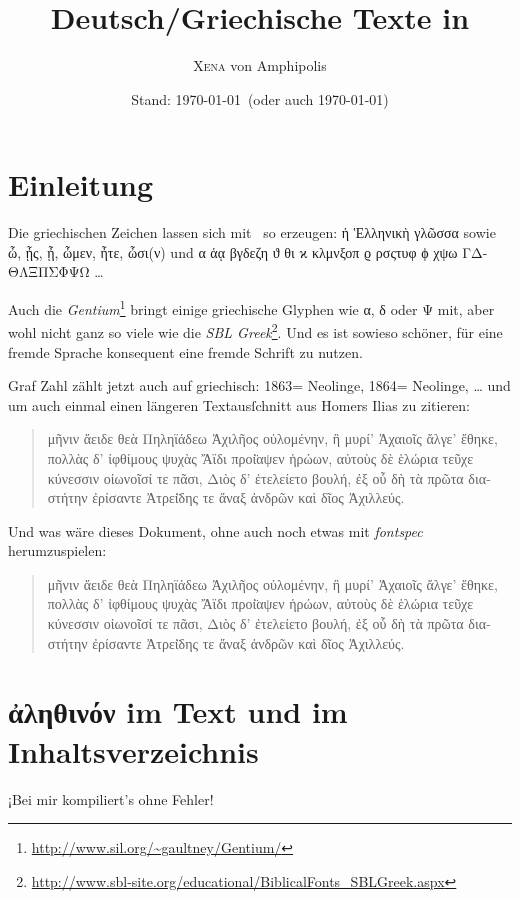 \documentclass[fontsize=10pt]{scrartcl} %
\begin{document}
\title{Deutsch/Griechische Texte in \XeTeX}
\author{\textsc{Xena} von Amphipolis}
\date{Stand: \today\ (oder auch \textgreek{\today})}
\maketitle

\tableofcontents

\section{Einleitung}
Die griechischen Zeichen lassen sich mit \XeTeX\ so erzeugen: \textgreek{ἡ Ἑλληνικὴ γλῶσσα} sowie \textgreek{ὦ, ᾖς, ᾖ, ὦμεν, ἦτε, ὦσι(ν)} und \textgreek{α ἁᾳ βγδεζη ϑ θι ϰ κλμνξοπ ϱ ρσςτυφ ϕ χψω ΓΔΘΛΞΠΣΦΨΩ} …

Auch die \emph{Gentium}\footnote{\url{http://www.sil.org/~gaultney/Gentium/}} bringt einige griechische Glyphen wie α, δ oder Ψ mit, aber wohl nicht ganz so viele wie die \emph{SBL Greek}\footnote{\url{http://www.sbl-site.org/educational/BiblicalFonts_SBLGreek.aspx}}. Und es ist sowieso schöner, für eine fremde Sprache konsequent eine fremde Schrift zu nutzen.

Graf Zahl zählt jetzt auch auf griechisch: \textgreek{1863=} Neolinge, \textgreek{1864=} Neolinge, … und um auch einmal einen längeren Textausſchnitt aus Homers Ilias zu zitieren:

\newcommand{\ilias}{μῆνιν ἄειδε θεὰ Πηληϊάδεω Ἀχιλῆος οὐλομένην, ἣ μυρί' Ἀχαιοῖς ἄλγε'
ἔθηκε, πολλὰς δ' ἰφθίμους ψυχὰς Ἄϊδι προί̈αψεν ἡρώων, αὐτοὺς δὲ ἑλώρια
τεῦχε κύνεσσιν οἰωνοῖσί τε πᾶσι, Διὸς δ' ἐτελείετο βουλή, ἐξ οὗ δὴ τὰ
πρῶτα διαστήτην ἐρίσαντε Ἀτρεί̈δης τε ἄναξ ἀνδρῶν καὶ δῖος Ἀχιλλεύς.}

\begin{quote}
\begin{greek}
\ilias
\end{greek}
\end{quote}

Und was wäre dieses Dokument, ohne auch noch etwas mit \emph{fontspec} herumzuspielen:
\begin{quote}
\begin{greek}
\ilias
\end{greek}
\end{quote}

\section{\texorpdfstring{\textgreek{ἀληθινόν} im Text und im Inhaltsverzeichnis}{Umschrift für den PDF-Link}}
¡Bei mir kompiliert’s ohne Fehler!
\end{document}
